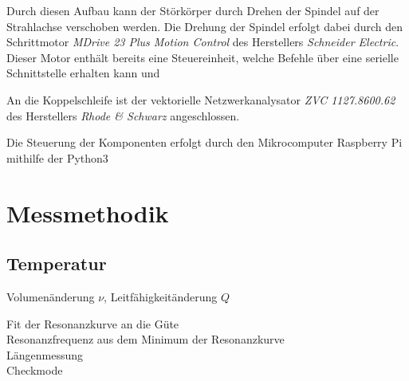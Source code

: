 Durch diesen Aufbau kann der Störkörper durch Drehen der Spindel auf der Strahlachse verschoben werden.
Die Drehung der Spindel erfolgt dabei durch den Schrittmotor \textit{MDrive 23 Plus Motion Control} des Herstellers \textit{Schneider Electric}.
Dieser Motor enthält bereits eine Steuereinheit, welche Befehle über eine serielle Schnittstelle erhalten kann und 

An die Koppelschleife ist der vektorielle Netzwerkanalysator \textit{ZVC 1127.8600.62} des Herstellers \textit{Rhode \& Schwarz} angeschlossen.

Die Steuerung der Komponenten erfolgt durch den Mikrocomputer Raspberry Pi mithilfe der Python3







\section{Messmethodik}

\subsection{Temperatur}
Volumenänderung $\nu$, Leitfähigkeitänderung $Q$

Fit der Resonanzkurve an die Güte\\
Resonanzfrequenz aus dem Minimum der Resonanzkurve\\
Längenmessung\\
Checkmode
